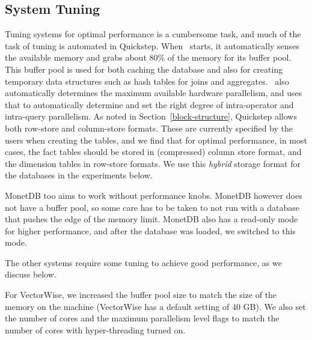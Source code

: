 
\subsection{System Tuning} \label{exp-tuning}
Tuning systems for optimal performance is a cumbersome task, and much of the task of tuning is automated in Quickstep.
When \Quickstep\ starts, it automatically senses the available memory and grabs about 80\% of the memory for its buffer pool.
This buffer pool is used for both caching the database and also for creating temporary data structures such as hash tables for joins and aggregates. \Quickstep\ also automatically determines the maximum available hardware parallelism, and uses that to automatically determine and set the right degree of intra-operator and intra-query parallelism. As noted in Section~\ref{block-structure}, Quickstep allows both row-store and column-store formats. These are currently specified by the users when creating the tables, and we find that for optimal performance, in most cases, the fact tables should be  stored in (compressed) column store format, and the dimension tables in row-store formats. We use this \textit{hybrid} storage format for the databases in the experiments below.

MonetDB too aims to work without performance knobs. MonetDB however does not have a buffer pool, so some care has to be taken to not run with a database that pushes the edge of the memory limit. MonetDB also has a read-only mode for higher performance, and after the database was loaded, we switched to this mode.

The other systems require some tuning to achieve good performance, as we discuss below.

For VectorWise, we increased the buffer pool size to match the size of the memory on the machine (VectorWise has a default setting of 40 GB). We also set the number of cores and the maximum parallelism level flags to match the number of cores with hyper-threading turned on.

